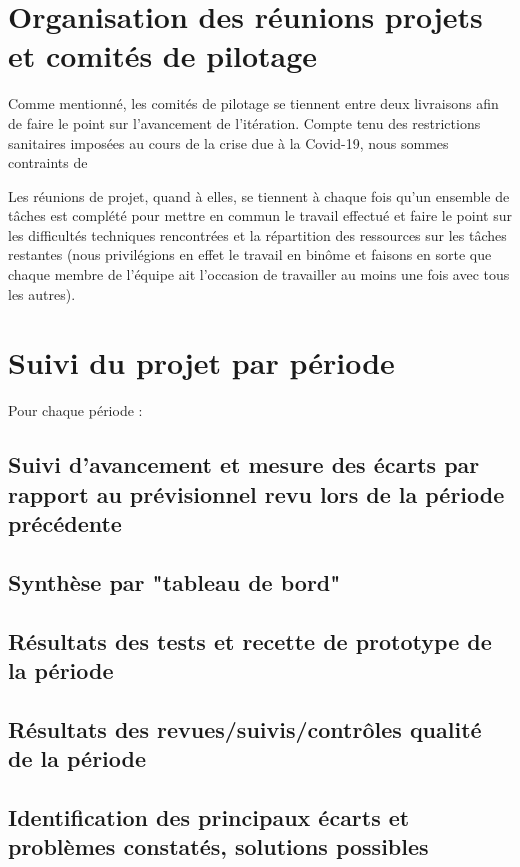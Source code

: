 \documentclass[12pt,a4paper,titlepage,openany]{report}
\begin{document}
    \section{Organisation des réunions projets et comités de pilotage}
        Comme mentionné, les comités de pilotage se tiennent entre deux livraisons
        afin de faire le point sur l'avancement de l'itération. Compte tenu des restrictions
        sanitaires imposées au cours de la crise due à la Covid-19, nous sommes contraints
        de

        Les réunions de projet, quand à elles, se tiennent à chaque fois qu'un ensemble de
        tâches est complété pour mettre en commun le travail effectué et faire le point sur
        les difficultés techniques rencontrées et la répartition des ressources sur les
        tâches restantes (nous privilégions en effet le travail en binôme et faisons en
        sorte que chaque membre de l'équipe ait l'occasion de travailler au moins une fois
        avec tous les autres).

    \section{Suivi du projet par période}
    Pour chaque période :
    \subsection{Suivi d’avancement et mesure des écarts par rapport au prévisionnel revu lors de la période précédente}

    \subsection{Synthèse par "tableau de bord"}

    \subsection{Résultats des tests et recette de prototype de la période}

    \subsection{Résultats des revues/suivis/contrôles qualité de la période}

    \subsection{Identification des principaux écarts et problèmes constatés, solutions possibles}
\end{document}

